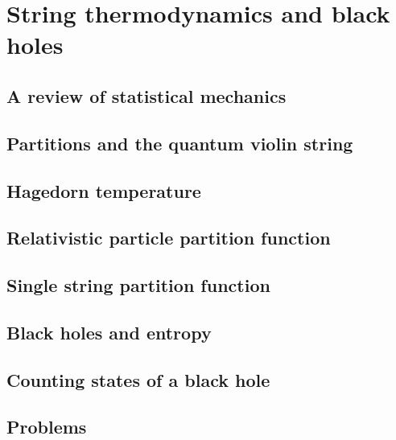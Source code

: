 \documentclass[12pt]{report}
\begin{document}
\chapter{String thermodynamics and black holes}
\newpage
\section{A review of statistical mechanics}
\section{Partitions and the quantum violin string}
\section{Hagedorn temperature}
\section{Relativistic particle partition function}
\section{Single string partition function}
\section{Black holes and entropy}
\section{Counting states of a black hole}
\section{Problems}
\end{document}
